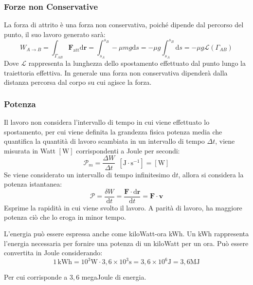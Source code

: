 \documentclass{article}
\newcommand{\vect}[1]{\boldsymbol{\mathbf{#1}}}
\newcommand{\df}{\mathrm{d}}
\numberwithin{equation}{subsection}
\begin{document}
\subsubsection{Forze non Conservative}
La forza di attrito è una forza non conservativa, poiché dipende 
dal percorso del punto, il suo lavoro generato sarà:
\begin{equation}
    W_{A\to B}=\displaystyle\int_{\Gamma_{AB}}\vect{F}_\mathrm{att}\df\vect{r}=\int_{s_A}^{s_B}-\mu mg \df s=-\mu g\int_{s_A}^{s_B}\df s=-\mu g\mathscr{L}(\Gamma_{AB})
\end{equation}
Dove $\mathscr{L}$ rappresenta la lunghezza dello spostamento effettuato dal punto lungo la traiettoria effettiva. In generale una forza non conservativa dipenderà dalla distanza percorsa dal corpo 
su cui agisce la forza. 

\subsubsection{Potenza}
Il lavoro non considera l'intervallo di tempo in cui viene effettuato 
lo spostamento, per cui viene definita la grandezza fisica potenza media 
che quantifica la quantità di lavoro scambiata in un intervallo 
di tempo $\Delta t$, viene misurata in Watt $[\mathrm{W}]$ corrispondenti a Joule per secondi: 
\begin{equation*}
    \mathscr{P}_{m}=\displaystyle\frac{\Delta W}{\Delta t}\:\:\left[\mathrm{J}\cdot\mathrm{s}^{-1}\right]=[\mathrm{W}]
\end{equation*}
Se viene considerato un intervallo di tempo infinitesimo $\df t$, allora 
si considera la potenza istantanea:
\begin{equation}
    \mathscr{P}=\displaystyle\frac{\delta W}{\df t}=\frac{\vect{F}\cdot \df\vect{r}}{\df t}=\vect{F}\cdot\vect{v}
\end{equation}
Esprime la rapidità in cui viene svolto il lavoro. A parità di lavoro, ha maggiore potenza ciò che lo eroga in minor tempo.  


L'energia può essere espressa anche come kiloWatt-ora kWh. Un kWh rappresenta l'energia necessaria per fornire una potenza di un kiloWatt per un ora. Può essere 
convertita in Joule considerando:
\begin{equation*}
    1\,\mathrm{kWh}=10^3\mathrm{W}\cdot3,6\times10^3\mathrm{s}=3,6\times10^6\mathrm{J}=3,6\mathrm{MJ}
\end{equation*}

Per cui corrisponde a $3,6$ megaJoule di energia. 
\end{document}
